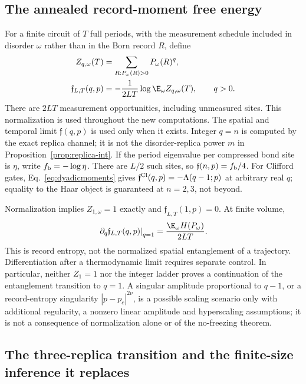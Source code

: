 \subsection{The annealed record-moment free energy}
\label{sec:phase-spine}

For a finite circuit of $T$ full periods, with the measurement schedule included in disorder $\omega$ rather than in the Born record $R$, define
\begin{align}
 Z_{q,\omega}(T)&=\sum_{R:P_\omega(R)>0}P_\omega(R)^q,\\
 \mathfrak f_{L,T}(q,p)&=-\frac{1}{2LT}\log\E_\omega Z_{q,\omega}(T),\qquad q>0.
 \label{eq:phase-spine}
\end{align}
There are $2LT$ measurement opportunities, including unmeasured sites. This normalization is used throughout the new computations. The spatial and temporal limit $\mathfrak f(q,p)$ is used only when it exists. Integer $q=n$ is computed by the exact replica channel; it is not the disorder-replica power $m$ in Proposition~\ref{prop:replica-int}. If the period eigenvalue per compressed bond site is $\eta$, write $f_{\rm b}=-\log\eta$. There are $L/2$ such sites, so $\mathfrak f(n,p)=f_{\rm b}/4$. For Clifford gates, Eq.~\eqref{eq:dyadicmoments} gives $\mathfrak f^{\rm Cl}(q,p)=-\Lambda(q-1;p)$ at arbitrary real $q$; equality to the Haar object is guaranteed at $n=2,3$, not beyond.

Normalization implies $Z_{1,\omega}=1$ exactly and $\mathfrak f_{L,T}(1,p)=0$. At finite volume,
\begin{equation}
 \left.\partial_q\mathfrak f_{L,T}(q,p)\right|_{q=1}
 =\frac{\E_\omega H(P_\omega)}{2LT}.
 \label{eq:phase-derivative}
\end{equation}
This is record entropy, not the normalized spatial entanglement of a trajectory. Differentiation after a thermodynamic limit requires separate control. In particular, neither $Z_1=1$ nor the integer ladder proves a continuation of the entanglement transition to $q=1$. A singular amplitude proportional to $q-1$, or a record-entropy singularity $|p-p_c|^{2\nu}$, is a possible scaling scenario only with additional regularity, a nonzero linear amplitude and hyperscaling assumptions; it is not a consequence of normalization alone or of the no-freezing theorem.

\subsection{The three-replica transition and the finite-size inference it replaces}
\label{sec:n3annealed}

